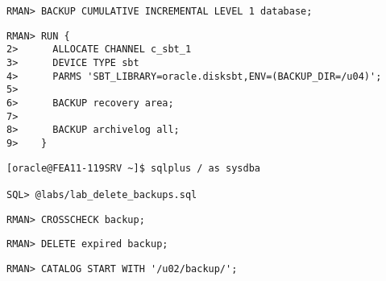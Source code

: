 \begin{enumerate}
      \begin{lstlisting}[caption={\oscommand{backup\_wed.cmd}},language=rman]
RMAN> BACKUP CUMULATIVE INCREMENTAL LEVEL 1 database;
      \end{lstlisting}
\clearpage
      \begin{lstlisting}[caption={\oscommand{backup\_sat\_fra.cmd}},language=rman]
RMAN> RUN {
2>      ALLOCATE CHANNEL c_sbt_1
3>      DEVICE TYPE sbt
4>      PARMS 'SBT_LIBRARY=oracle.disksbt,ENV=(BACKUP_DIR=/u04)';
5>
6>      BACKUP recovery area;
7>
8>      BACKUP archivelog all;
9>    }
      \end{lstlisting}
    
    \begin{lstlisting}[language=terminal]
[oracle@FEA11-119SRV ~]$ sqlplus / as sysdba

SQL> @labs/lab_delete_backups.sql
    \end{lstlisting}
    
    \begin{lstlisting}[language=rman]
RMAN> CROSSCHECK backup;
    \end{lstlisting}
    
    \begin{lstlisting}[language=rman]
RMAN> DELETE expired backup;
    \end{lstlisting}
    
    \begin{lstlisting}[language=rman]
RMAN> CATALOG START WITH '/u02/backup/';
    \end{lstlisting}
  \end{enumerate}
